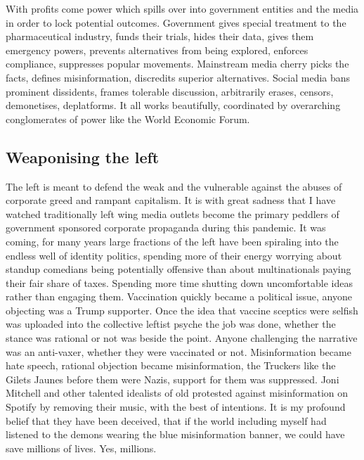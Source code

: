 \documentclass[11pt,a4paper,notitlepage]{report}
\begin{document}
With profits come power which spills over into government entities and the media in order to lock potential outcomes. Government gives special treatment to the pharmaceutical industry, funds their trials, hides their data, gives them emergency powers, prevents alternatives from being explored, enforces compliance, suppresses popular movements. Mainstream media cherry picks the facts, defines misinformation, discredits superior alternatives. Social media bans prominent dissidents, frames tolerable discussion, arbitrarily erases, censors, demonetises, deplatforms. It all works beautifully, coordinated by overarching conglomerates of power like the World Economic Forum.

\subsection*{Weaponising the left}

The left is meant to defend the weak and the vulnerable against the abuses of corporate greed and rampant capitalism. It is with great sadness that I have watched traditionally left wing media outlets become the primary peddlers of government sponsored corporate propaganda during this pandemic. It was coming, for many years large fractions of the left have been spiraling into the endless well of identity politics, spending more of their energy worrying about standup comedians being potentially offensive than about multinationals paying their fair share of taxes. Spending more time shutting down uncomfortable ideas rather than engaging them. Vaccination quickly became a political issue, anyone objecting was a Trump supporter. Once the idea that vaccine sceptics were selfish was uploaded into the collective leftist psyche the job was done, whether the stance was rational or not was beside the point. Anyone challenging the narrative was an anti-vaxer, whether they were vaccinated or not. Misinformation became hate speech, rational objection became misinformation, the Truckers like the Gilets Jaunes before them were Nazis, support for them was suppressed. Joni Mitchell and other talented idealists of old protested against misinformation on Spotify by removing their music, with the best of intentions. It is my profound belief that they have been deceived, that if the world including myself had listened to the demons wearing the blue misinformation banner, we could have save millions of lives. Yes, millions.
\end{document}
